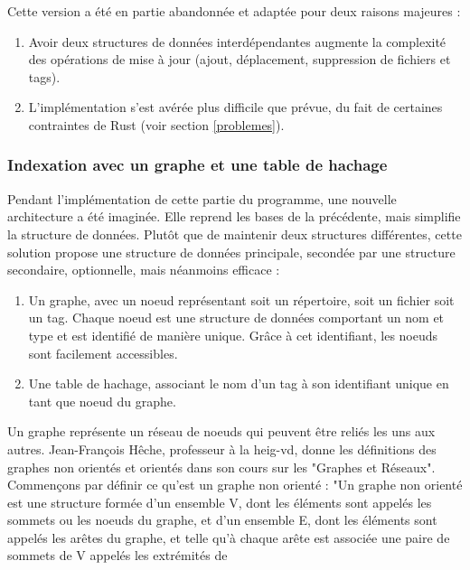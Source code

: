 Cette version a été en partie abandonnée et adaptée pour deux raisons majeures :
\begin{enumerate}
    \item Avoir deux structures de données interdépendantes augmente la complexité des 
        opérations de mise à jour (ajout, déplacement, suppression de fichiers et tags).
    \item L'implémentation s'est avérée plus difficile que prévue, du fait de certaines 
        contraintes de Rust (voir section \ref{problemes}).
\end{enumerate}

\subsubsection{Indexation avec un graphe et une table de hachage}\label{graphe_architecture}
Pendant l'implémentation de cette partie du programme, 
une nouvelle architecture a été imaginée. Elle reprend les bases de la précédente, mais simplifie 
la structure de données. Plutôt que de maintenir deux structures différentes, cette solution 
propose une structure de données principale, secondée par une structure secondaire, optionnelle, 
mais néanmoins efficace :
\begin{enumerate}
    \item Un graphe, avec un noeud représentant soit un répertoire, soit un fichier 
        soit un tag. Chaque noeud est une structure de données comportant un nom et type et est 
        identifié de manière unique. Grâce à cet identifiant, les noeuds sont facilement accessibles.
    \item Une table de hachage, associant le nom d'un tag à son identifiant unique en tant que 
        noeud du graphe.
\end{enumerate}
Un graphe représente un réseau de noeuds qui peuvent être reliés les uns aux autres. Jean-François Hêche, 
professeur à la heig-vd, donne les définitions des graphes non orientés et orientés dans son cours 
sur les "Graphes et Réseaux". Commençons par définir ce qu'est un graphe non orienté : 
"Un graphe non orienté est une structure formée d'un ensemble V, dont les éléments sont appelés les sommets 
ou les noeuds du graphe, et d'un ensemble E, dont les éléments sont appelés les arêtes du graphe, 
et telle qu'à chaque arête est associée une paire de sommets de V appelés les extrémités de 
